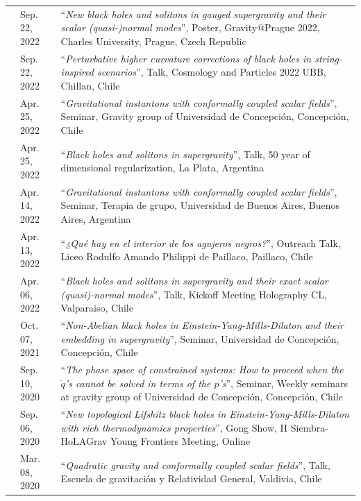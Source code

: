 \documentclass[11pt]{article}
\newenvironment{cvblock}[3]
{
\noindent
\begin{longtable}{p{#1}  >{\raggedright\arraybackslash}p{#2} p{#3}}
}
{
\end{longtable}
}
\newcommand{\cventry}[3]{\textbf{#1} & #2 & #3 \\ }
\newcommand{\talk}[2]{\small “\textit{#1}”, #2\vspace{0.2cm}}
\begin{document}
\begin{cvblock}{0cm}{2.3cm}{13cm}
	\cventry{}{\small Sep. 22, 2022}{\talk{New black holes and solitons in gauged supergravity and their scalar (quasi-)normal modes}{Poster, Gravity@Prague 2022, Charles University, Prague, Czech Republic}}

	\cventry{}{\small Sep. 22, 2022}{\talk{Perturbative higher curvature corrections of black holes in string-inspired scenarios}{Talk, Cosmology and Particles 2022 UBB, Chillan, Chile}}

	\cventry{}{\small Apr. 25, 2022}{\talk{Gravitational instantons with conformally coupled scalar fields}{Seminar, Gravity group of Universidad de Concepción, Concepción, Chile}}

	\cventry{}{\small Apr. 25, 2022}{\talk{Black holes and solitons in supergravity}{Talk, 50 year of dimensional regularization, La Plata, Argentina}}

	\cventry{}{\small Apr. 14, 2022}{\talk{Gravitational instantons with conformally coupled scalar fields}{Seminar, Terapia de grupo, Universidad de Buenos Aires, Buenos Aires, Argentina}}

	\cventry{}{\small Apr. 13, 2022}{\talk{¿Qué hay en el interior de los agujeros negros?}{Outreach Talk, Liceo Rodulfo Amando Philippi de Paillaco, Paillaco, Chile}}

	\cventry{}{\small Apr. 06, 2022}{\talk{Black holes and solitons in supergravity and their exact scalar (quasi)-normal modes}{Talk, Kickoff Meeting Holography CL, Valparaiso, Chile}}

	\cventry{}{\small Oct. 07, 2021}{\talk{Non-Abelian black holes in Einstein-Yang-Mills-Dilaton and their embedding in supergravity}{Seminar, Universidad de Concepción, Concepción, Chile}}

	\cventry{}{\small Sep. 10, 2020}{\talk{The phase space of constrained systems: How to proceed when the $\dot{q}$’s cannot be solved in terms of the $p$’s}{Seminar, Weekly seminars at gravity group of Universidad de Concepción, Concepción, Chile}}

	\cventry{}{\small Sep. 06, 2020}{\talk{New topological Lifshitz black holes in Einstein-Yang-Mills-Dilaton with rich thermodynamics properties}{Gong Show, II Siembra-HoLAGrav Young Frontiers Meeting, Online}}

	\cventry{}{\small Mar. 08, 2020}{\talk{Quadratic gravity and conformally coupled scalar fields}{Talk, Escuela de gravitación y Relatividad General, Valdivia, Chile}}
\end{cvblock}
\end{document}
